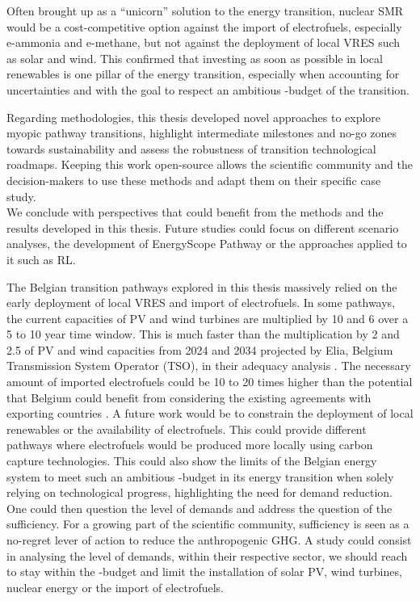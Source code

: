 Often brought up as a ``unicorn'' solution to the energy transition, nuclear \gls{SMR} would be a cost-competitive option against the import of electrofuels, especially e-ammonia and e-methane, but not against the deployment of local \acrfull{VRES} such as solar and wind. This confirmed that investing as soon as possible in local renewables is one pillar of the energy transition, especially when accounting for uncertainties and with the goal to respect an ambitious -budget of the transition. 

Regarding methodologies, this thesis developed novel approaches to explore myopic pathway transitions, highlight intermediate milestones and no-go zones towards sustainability and assess the robustness of transition technological roadmaps. Keeping this work open-source allows the scientific community and the decision-makers to use these methods and adapt them on their specific case study. \\


We conclude with perspectives that could benefit from the methods and the results developed in this thesis.  Future studies could focus on different scenario analyses, the development of EnergyScope Pathway or the approaches applied to it such as \gls{RL}. 

The Belgian transition pathways explored in this thesis massively relied on the early deployment of local \gls{VRES} and import of electrofuels. In some pathways, the current capacities of \gls{PV} and wind turbines are multiplied by 10 and 6 over a 5 to 10 year time window. This is much faster than the multiplication by 2 and 2.5 of PV and wind capacities from 2024 and 2034 projected by Elia, Belgium Transmission System Operator (TSO), in their adequacy analysis \cite{Elia_2024_2034}. The necessary amount of imported electrofuels could be 10 to 20 times higher than the potential that Belgium could benefit from considering the existing agreements with exporting countries \cite{lefebvre2022electrofuel}. A future work would be to constrain the deployment of local renewables or the availability of electrofuels. This could provide different pathways where electrofuels would be produced more locally using carbon capture technologies. This could also show the limits of the Belgian energy system to meet such an ambitious -budget in its energy transition when solely relying on technological progress, highlighting the need for demand reduction. One could then question the level of demands and address the question of the sufficiency. For a growing part of the scientific community, sufficiency is seen as a no-regret lever of action to reduce the anthropogenic \gls{GHG}. A study could consist in analysing the level of demands, within their respective sector, we should reach to stay within the -budget and limit the installation of solar PV, wind turbines, nuclear energy or the import of electrofuels.

